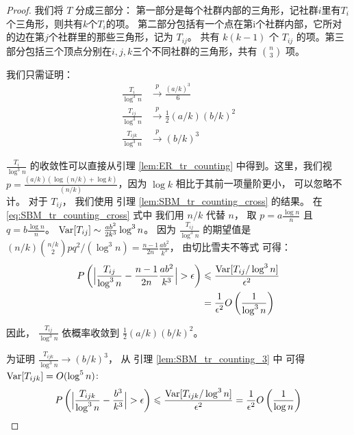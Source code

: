 \begin{proof}
 我们将 $T$ 分成三部分：
 第一部分是每个社群内部的三角形，记社群$i$里有$T_i$个三角形，则共有$k$个$T_i$的项。
 第二部分包括有一个点在第i个社群内部，它所对的边在第$j$个社群里的那些三角形，记为 $T_{ij}$。
 共有 $k(k-1)$ 个 $T_{ij}$ 的项。第三部分包括三个顶点分别在$i,j,k$三个不同社群的三角形，共有
 $\binom{n}{3}$ 项。
	
	我们只需证明：
\begin{align}
	\frac{T_i}{\log ^3 n} &\xrightarrow{p} \frac{(a/k)^3}{6} \\
	\frac{T_{ij}}{\log^3 n}& \xrightarrow{p}\frac{1}{2}(a/k)(b/k)^2\\
	\frac{T_{ijk}}{\log^3 n} & \xrightarrow{p} (b/k)^3
	\end{align}
	
	$\frac{T_i}{\log ^3 n}$ 的收敛性可以直接从引理
  \ref{lem:ER_tr_counting} 中得到。这里，我们视$p=\frac{(a/k) (
    \log (n/k) + \log k)}{(n/k)}$，因为 $\log k$ 相比于其前一项量阶更小，
    可以忽略不计。
	对于 $T_{ij}$， 我们使用 
  引理 \ref{lem:SBM_tr_counting_cross} 的结果。
	在 \eqref{eq:SBM_tr_counting_cross} 式中
  我们用 $n/k$ 代替 $n$， 取 $p=a\frac{\log n}{n}$ 且 $q=b\frac{\log n}{n}$。
	$\operatorname{\mathrm{Var}}[T_{ij}] \sim \frac{ab^2}{2k^3} \log^3 n$。
  因为 $\frac{T_{ij}}{\log^3 n}$ 的期望值是
  $(n/k)\binom{n/k}{2}pq^2/(\log^3 n)
	=\frac{n-1}{2n}\frac{ab^2}{k^3}$， 由切比雪夫不等式
  可得：
	\begin{align*}
	P \left( \Big|\frac{T_{ij}}{\log^3 n} - \frac{n-1}{2n}\frac{ab^2}{k^3} \Big| > \epsilon
  \right) &\leqslant \frac{\operatorname{\mathrm{Var}}[T_{ij} / \log^3 n]}{\epsilon^2} \\
	& = \frac{1}{\epsilon^2}
	O \left( \frac{1}{\log^3 n} \right)
	\end{align*}
	
	因此， $\frac{T_{ij}}{\log^3 n} $ 依概率收敛到 $\frac{1}{2}(a/k)(b/k)^2$。
	
	为证明
  $\frac{T_{ijk}}{\log^3 n}\to (b/k)^3$，
  从 引理 \ref{lem:SBM_tr_counting_3} 中
  可得 $\operatorname{\mathrm{Var}}[T_{ijk}] = O(\log^5 n)$:
	$$
	P \left( \Big|\frac{T_{ijk}}{\log^3 n} -\frac{b^3}{k^3} \Big| > \epsilon
  \right) \leqslant \frac{\operatorname{\mathrm{Var}}[T_{ijk} / \log^3 n]}{\epsilon^2} = \frac{1}{\epsilon^2}
	O \left(\frac{1}{\log n} \right)
	$$
\end{proof}
